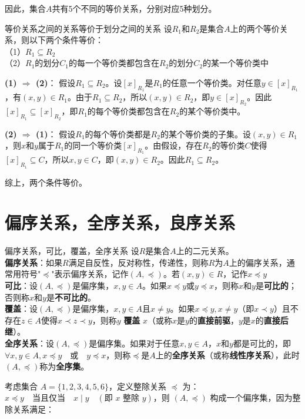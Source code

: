 因此，集合$A$共有5个不同的等价关系，分别对应5种划分。
\begin{theorem}{等价关系之间的关系等价于划分之间的关系}{}
    设$R_1$和$R_2$是集合$A$上的两个等价关系，则以下两个条件等价：\\
    （1）$R_1 \subseteq R_2$\\
    （2）$R_1$的划分$C_1$的每一个等价类都包含在$R_2$的划分$C_2$的某一个等价类中
\end{theorem}
\textbf{(1) $\Rightarrow$ (2)}：
假设$R_1 \subseteq R_2$。设$[x]_{R_1}$是$R_1$的任意一个等价类。对任意$y \in [x]_{R_1}$，有$(x,y) \in R_1$。由于$R_1 \subseteq R_2$，所以$(x,y) \in R_2$，即$y \in [x]_{R_2}$。因此$[x]_{R_1} \subseteq [x]_{R_2}$，即$R_1$的每个等价类都包含在$R_2$的某个等价类中。

\textbf{(2) $\Rightarrow$ (1)}：
假设$R_1$的每个等价类都是$R_2$的某个等价类的子集。设$(x,y) \in R_1$，则$x$和$y$属于$R_1$的同一个等价类$[x]_{R_1}$。由假设，存在$R_2$的等价类$C$使得$[x]_{R_1} \subseteq C$，所以$x,y \in C$，即$(x,y) \in R_2$。因此$R_1 \subseteq R_2$。

综上，两个条件等价。
\section{偏序关系，全序关系，良序关系}
\begin{definition}{偏序关系，可比，覆盖，全序关系}{}
设$R$是集合$A$上的二元关系。\\
\textbf{偏序关系}：如果$R$满足自反性，反对称性，传递性，则称$R$为$A$上的偏序关系，通常用符号"$\preccurlyeq $"表示偏序关系，记作$(A, \preccurlyeq )$。若$(x,y)\in R$，记作$x \preccurlyeq  y$\\
\textbf{可比}：设$(A, \preccurlyeq )$是偏序集，$x,y \in A$。如果$x \preccurlyeq  y$或$y \preccurlyeq  x$，则称$x$和$y$是\textbf{可比的}；否则称$x$和$y$是\textbf{不可比的}。\\
\textbf{覆盖}：设$(A, \preccurlyeq )$是偏序集，$x,y \in A$且$x \neq y$。如果$x \preccurlyeq  y,x\neq y$（即$x\prec y$）且不存在$z \in A$使得$x \prec z\prec  y$，则称$y$ \textbf{覆盖} $x$（或称$x$是$y$的\textbf{直接前驱}，$y$是$x$的\textbf{直接后继}）。\\
\textbf{全序关系}：设$(A, \preccurlyeq)$是偏序集。如果对于任意$x, y \in A$，$x$和$y$都是可比的，即$\forall x, y \in A, x \preccurlyeq y \quad \text{或} \quad y \preccurlyeq x$，则称$\preccurlyeq$是$A$上的\textbf{全序关系}（或称\textbf{线性序关系}），此时$(A, \preccurlyeq)$称为\textbf{全序集}。
\end{definition}
考虑集合 $A = \{1, 2, 3, 4, 5, 6\}$，定义整除关系 $\preccurlyeq$ 为：$
x \preccurlyeq y \quad \text{当且仅当} \quad x \mid y \quad (\text{即 } x \text{ 整除 } y)$，则 $(A, \preccurlyeq)$ 构成一个偏序集，因为整除关系满足：

